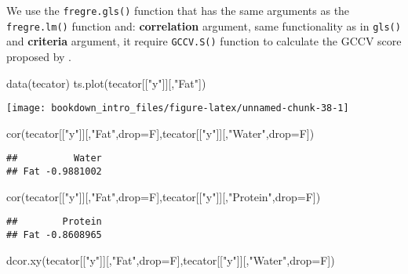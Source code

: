 \documentclass[
]{book}
\newenvironment{Shaded}{\begin{snugshade}}{\end{snugshade}}
\newcommand{\AttributeTok}[1]{\textcolor[rgb]{0.77,0.63,0.00}{#1}}
\newcommand{\FunctionTok}[1]{\textcolor[rgb]{0.00,0.00,0.00}{#1}}
\newcommand{\NormalTok}[1]{#1}
\newcommand{\StringTok}[1]{\textcolor[rgb]{0.31,0.60,0.02}{#1}}
\begin{document}
We use the \texttt{fregre.gls()} function that has the same arguments as the \texttt{fregre.lm()} function and: \textbf{correlation} argument, same functionality as in \texttt{gls()} and \textbf{criteria} argument, it require \texttt{GCCV.S()} function to calculate the GCCV score proposed by \citet{carmack2012generalised}.

\begin{Shaded}
\begin{Highlighting}[]
\FunctionTok{data}\NormalTok{(tecator)}
\FunctionTok{ts.plot}\NormalTok{(tecator[[}\StringTok{"y"}\NormalTok{]][,}\StringTok{"Fat"}\NormalTok{])}
\end{Highlighting}
\end{Shaded}

\begin{center}\texttt{[image: bookdown\_intro\_files/figure-latex/unnamed-chunk-38-1]} \end{center}

\begin{Shaded}
\begin{Highlighting}[]
\FunctionTok{cor}\NormalTok{(tecator[[}\StringTok{"y"}\NormalTok{]][,}\StringTok{"Fat"}\NormalTok{,}\AttributeTok{drop=}\NormalTok{F],tecator[[}\StringTok{"y"}\NormalTok{]][,}\StringTok{"Water"}\NormalTok{,}\AttributeTok{drop=}\NormalTok{F])}
\end{Highlighting}
\end{Shaded}

\begin{verbatim}
##          Water
## Fat -0.9881002
\end{verbatim}

\begin{Shaded}
\begin{Highlighting}[]
\FunctionTok{cor}\NormalTok{(tecator[[}\StringTok{"y"}\NormalTok{]][,}\StringTok{"Fat"}\NormalTok{,}\AttributeTok{drop=}\NormalTok{F],tecator[[}\StringTok{"y"}\NormalTok{]][,}\StringTok{"Protein"}\NormalTok{,}\AttributeTok{drop=}\NormalTok{F])}
\end{Highlighting}
\end{Shaded}

\begin{verbatim}
##        Protein
## Fat -0.8608965
\end{verbatim}

\begin{Shaded}
\begin{Highlighting}[]
\FunctionTok{dcor.xy}\NormalTok{(tecator[[}\StringTok{"y"}\NormalTok{]][,}\StringTok{"Fat"}\NormalTok{,}\AttributeTok{drop=}\NormalTok{F],tecator[[}\StringTok{"y"}\NormalTok{]][,}\StringTok{"Water"}\NormalTok{,}\AttributeTok{drop=}\NormalTok{F])}
\end{Highlighting}
\end{Shaded}
\end{document}

